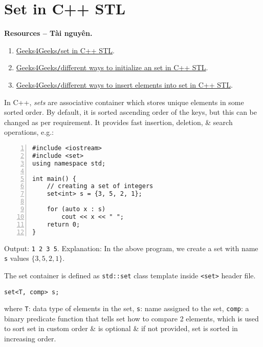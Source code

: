 \documentclass{article}
\begin{document}
\section{Set in C++ STL}
\textbf{\textsf{Resources -- Tài nguyên.}}
\begin{enumerate}
	\item \href{https://www.geeksforgeeks.org/set-in-cpp-stl/}{Geeks4Geeks{\tt/}set in C++ STL}.
	\item \href{https://www.geeksforgeeks.org/different-ways-to-initialize-an-set-in-cpp/}{Geeks4Geeks{\tt/}different ways to initialize an set in C++ STL}.
	\item \href{https://www.geeksforgeeks.org/different-ways-to-insert-elements-in-set-in-cpp-stl/}{Geeks4Geeks{\tt/}different ways to insert elements into set in C++ STL}.
\end{enumerate}
In C++, {\it sets} are associative container which stores unique elements in some sorted order. By default, it is sorted ascending order of the keys, but this can be changed as per requirement. It provides fast insertion, deletion, \& search operations, e.g.:
\begin{Verbatim}[numbers=left,xleftmargin=5mm]
#include <iostream>
#include <set>
using namespace std;

int main() {
    // creating a set of integers
    set<int> s = {3, 5, 2, 1};
	
    for (auto x : s)
        cout << x << " ";
    return 0;
}
\end{Verbatim}
Output: {\tt1 2 3 5}. Explanation: In the above program, we create a set with name {\tt s} values $\{3,5,2,1\}$.

 The set container is defined as {\tt std::set} class template inside {\tt<set>} header file.
\begin{verbatim}
set<T, comp> s;
\end{verbatim}
where {\tt T}: data type of elements in the set, {\tt s}: name assigned to the set, {\tt comp}: a binary predicate function that tells set how to compare 2 elements, which is used to sort set in custom order \& is optional \& if not provided, set is sorted in increasing order.

\end{document}
